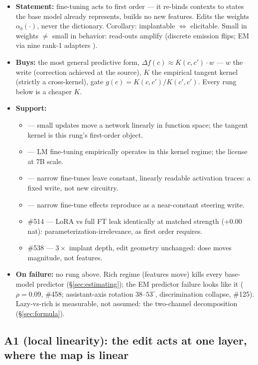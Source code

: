 \documentclass[11pt]{article}
\begin{document}
\begin{itemize}
\item \textbf{Statement:} fine-tuning acts to first order --- it re-binds contexts to states the base model already represents, builds no new features. Edits the weights $\alpha_b(\cdot)$, never the dictionary. Corollary: implantable $\Leftrightarrow$ elicitable. Small in weights $\neq$ small in behavior: read-outs amplify (discrete emission flips; EM via nine rank-1 adapters \cite{soligo2025}).
\item \textbf{Buys:} the most general predictive form, $\Delta f(c) \approx K(c,c') \cdot w$ --- $w$ the write (correction achieved at the source), $K$ the empirical tangent kernel (strictly a cross-kernel), gate $g(c) = K(c,c')/K(c',c')$. Every rung below is a cheaper $K$.
\item \textbf{Support:}
  \begin{itemize}
  \item \cite{jacot2018} --- small updates move a network linearly in function space; the tangent kernel is this rung's first-order object.
  \item \cite{malladi2023} --- LM fine-tuning empirically operates in this kernel regime; the license at 7B scale.
  \item \cite{minder2025} --- narrow fine-tunes leave constant, linearly readable activation traces: a fixed write, not new circuitry.
  \item \cite{engels2025} --- narrow fine-tune effects reproduce as a near-constant steering write.
  \item \#514 --- LoRA vs full FT leak identically at matched strength ($+0.00$ nat): parameterization-irrelevance, as first order requires.
  \item \#538 --- $3\times$ implant depth, edit geometry unchanged: dose moves magnitude, not features.
  \end{itemize}
\item \textbf{On failure:} no rung above. Rich regime (features move) kills every base-model predictor (\S\ref{sec:estimating}); the EM predictor failure looks like it ($\rho = 0.09$, \#458; assistant-axis rotation $38$--$53^{\circ}$, discrimination collapse, \#125). Lazy-vs-rich is measurable, not assumed: the two-channel decomposition (\S\ref{sec:formula}).
\end{itemize}

\subsection*{A1 (local linearity): the edit acts at one layer, where the map is linear}
\end{document}

